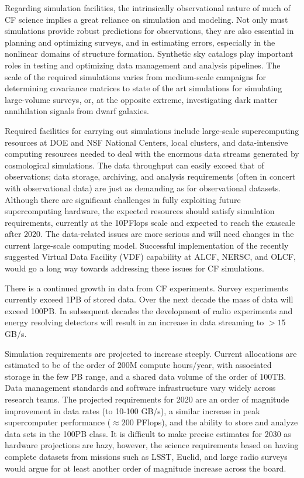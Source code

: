 Regarding simulation facilities, 
the intrinsically observational nature of much of CF
science implies a great reliance on simulation and modeling. Not only
must simulations provide robust predictions for observations, they are
also essential in planning and optimizing surveys, and in estimating
errors, especially in the nonlinear domains of structure
formation. Synthetic sky catalogs play important roles in testing and
optimizing data management and analysis pipelines. The scale of the
required simulations varies from medium-scale campaigns for
determining covariance matrices to state of the art simulations for
simulating large-volume surveys, or, at the opposite extreme,
investigating dark matter annihilation signals from dwarf galaxies.

Required facilities for carrying out simulations include large-scale
supercomputing resources at DOE and NSF National Centers, local
clusters, and data-intensive computing resources needed to deal with
the enormous data streams generated by cosmological simulations. The
data throughput can easily exceed that of observations; data storage,
archiving, and analysis requirements (often in concert with
observational data) are just as demanding as for observational
datasets. Although there are significant challenges in fully
exploiting future supercomputing hardware, the expected resources
should satisfy simulation requirements, currently at the 10PFlops
scale and expected to reach the exascale after 2020. The data-related
issues are more serious and will need changes in the current
large-scale computing model. Successful implementation of the recently
suggested Virtual Data Facility (VDF) capability at ALCF, NERSC, and
OLCF, would go a long way towards addressing these issues for CF 
simulations.

There is a continued growth in data from CF
experiments. 
Survey experiments currently exceed 1PB of stored
data. Over the next decade the mass of data will exceed 100PB. In
subsequent decades the development of radio experiments and energy
resolving detectors will result in an increase in data streaming to
$> 15$GB/s.

Simulation requirements are projected to increase steeply. Current
allocations are estimated to be of the order of 200M compute
hours/year, with associated storage in the few PB range, and a shared
data volume of the order of 100TB. Data management standards and
software infrastructure vary widely across research teams. The
projected requirements for 2020 are an order of magnitude improvement
in data rates (to 10-100 GB/s), a similar increase in peak
supercomputer performance ($\approx 200$ PFlops), and the ability to store and
analyze data sets in the 100PB class. It is difficult to make precise
estimates for 2030 as hardware projections are hazy, however, the
science requirements based on having complete datasets from missions
such as LSST, Euclid, and large radio surveys would argue for at least
another order of magnitude increase across the board.


